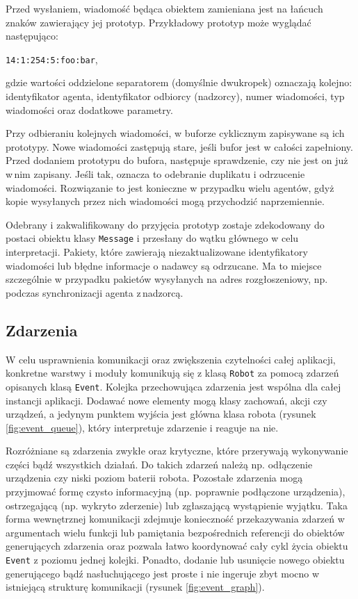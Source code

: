 Przed wysłaniem, wiadomość będąca obiektem zamieniana jest na łańcuch znaków zawierający jej prototyp. Przykładowy prototyp może wyglądać następująco:
\begin{center} {\tt 14:1:254:5:foo:bar},\\ \end{center}
gdzie wartości oddzielone separatorem (domyślnie dwukropek) oznaczają kolejno: identyfikator agenta, identyfikator odbiorcy (nadzorcy), numer wiadomości, typ\,wiadomości oraz dodatkowe parametry.

Przy odbieraniu kolejnych wiadomości, w buforze cyklicznym zapisywane są ich prototypy. Nowe wiadomości zastępują stare, jeśli bufor jest w całości zapełniony. Przed dodaniem prototypu do bufora, następuje sprawdzenie, czy nie jest on już w\,nim zapisany. Jeśli tak, oznacza to odebranie duplikatu i odrzucenie wiadomości. Rozwiązanie to jest konieczne w przypadku wielu agentów, gdyż kopie wysyłanych przez nich wiadomości mogą przychodzić naprzemiennie.

Odebrany i zakwalifikowany do przyjęcia prototyp zostaje zdekodowany do postaci obiektu klasy {\tt Message} i przesłany do wątku głównego w celu interpretacji. Pakiety, które zawierają niezaktualizowane identyfikatory wiadomości lub błędne informacje o nadawcy są odrzucane. Ma to miejsce szczególnie w przypadku pakietów wysyłanych na adres rozgłoszeniowy, np. podczas synchronizacji agenta z\,nadzorcą.

\subsection{Zdarzenia}

W celu usprawnienia komunikacji oraz zwiększenia czytelności całej aplikacji, konkretne warstwy i moduły komunikują się z klasą {\tt Robot} za pomocą zdarzeń opisanych klasą {\tt Event}. Kolejka przechowująca zdarzenia jest wspólna dla całej instancji aplikacji. Dodawać nowe elementy mogą klasy zachowań, akcji czy urządzeń, a jedynym punktem wyjścia jest główna klasa robota (rysunek \ref{fig:event_queue}), który interpretuje zdarzenie i reaguje na nie.

Rozróżniane są zdarzenia zwykłe oraz krytyczne, które przerywają wykonywanie części bądź wszystkich działań. Do takich zdarzeń należą np. odłączenie urządzenia czy niski poziom baterii robota. Pozostałe zdarzenia mogą przyjmować formę czysto informacyjną (np. poprawnie podłączone urządzenia), ostrzegającą (np. wykryto zderzenie) lub zgłaszającą wystąpienie wyjątku. Taka forma wewnętrznej komunikacji zdejmuje konieczność przekazywania zdarzeń w argumentach wielu funkcji lub pamiętania bezpośrednich referencji do obiektów generujących zdarzenia oraz pozwala łatwo koordynować cały cykl życia obiektu {\tt Event} z poziomu jednej kolejki. Ponadto, dodanie lub usunięcie nowego obiektu generującego bądź nasłuchującego jest proste i nie ingeruje zbyt mocno w istniejącą strukturę komunikacji (rysunek \ref{fig:event_graph}).

